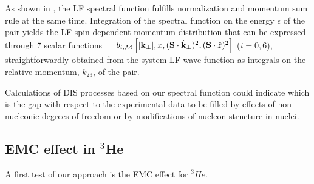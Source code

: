 { As shown in \cite{LFSF}, the LF
 spectral function  
fulfills {normalization and momentum sum rule  at the same time. Integration of the spectral function on the energy 
$\epsilon$ 
of the pair yields the LF spin-dependent momentum distribution that
can  be expressed through 7 scalar functions ~~ {{${b}_{i,{\cal M}}\left [ |{\bf k}_{\perp}|,x,({\bf  S}\cdot \hat {\bf k}_{\perp})^2,({\bf  S} \cdot {\hat z})^2 \right] $}}} ($i=0,6$), straightforwardly obtained from the system LF wave function as integrals on the relative momentum, $k_{23}$, of the pair.

{{Calculations of DIS 
 processes  based on our spectral function could indicate which is the gap with respect to the experimental data to be filled by effects of non-nucleonic degrees of freedom or by modifications of nucleon structure in nuclei.}}
\vspace{-5mm}
\subsection{EMC effect in {$^3$He} }
\vspace{-1mm}
{A first test of our approach is the EMC effect for $^3He$.} 

}
